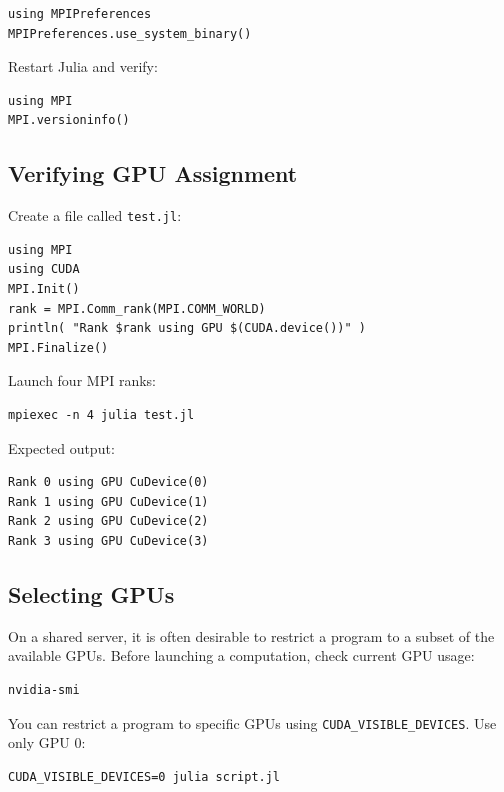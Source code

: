 \begin{lstlisting} 
using MPIPreferences 
MPIPreferences.use_system_binary() 
\end{lstlisting} 

Restart Julia and verify: 

\begin{lstlisting} 
using MPI 
MPI.versioninfo() 
\end{lstlisting}

\subsection{Verifying GPU Assignment} 

Create a file called \texttt{test.jl}: 

\begin{lstlisting} 
using MPI 
using CUDA 
MPI.Init() 
rank = MPI.Comm_rank(MPI.COMM_WORLD) 
println( "Rank $rank using GPU $(CUDA.device())" ) 
MPI.Finalize() 
\end{lstlisting} 

Launch four MPI ranks: 

\begin{lstlisting} 
mpiexec -n 4 julia test.jl 
\end{lstlisting}

Expected output: 

\begin{lstlisting} 
Rank 0 using GPU CuDevice(0) 
Rank 1 using GPU CuDevice(1) 
Rank 2 using GPU CuDevice(2) 
Rank 3 using GPU CuDevice(3) 
\end{lstlisting}


\subsection{Selecting GPUs} 

On a shared server, it is often desirable to restrict a program to a subset of the available GPUs. Before launching a computation, check current GPU usage: 

\begin{lstlisting} 
nvidia-smi 
\end{lstlisting} 

You can restrict a program to specific GPUs using \texttt{CUDA\_VISIBLE\_DEVICES}. Use only GPU 0: 

\begin{lstlisting} 
CUDA_VISIBLE_DEVICES=0 julia script.jl 
\end{lstlisting} 


